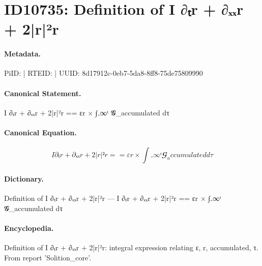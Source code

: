 \section*{ID10735: Definition of I ∂ₜr + ∂ₓₓr + 2|r|²r}
\paragraph{Metadata.}
PiID:  | RTEID:  | UUID: 8d17912c-0eb7-5da8-8ff8-75de75809990

\paragraph{Canonical Statement.}
I ∂ₜr + ∂ₓₓr + 2|r|²r == εr × ∫₋∞ᵗ 𝓖\_accumulated dτ

\paragraph{Canonical Equation.}
\[
I ∂ₜr + ∂ₓₓr + 2|r|²r == εr × ∫₋∞ᵗ 𝓖_accumulated dτ
\]

\paragraph{Dictionary.}
Definition of I ∂ₜr + ∂ₓₓr + 2|r|²r — I ∂ₜr + ∂ₓₓr + 2|r|²r == εr × ∫₋∞ᵗ 𝓖\_accumulated dτ

\paragraph{Encyclopedia.}
Definition of I ∂ₜr + ∂ₓₓr + 2|r|²r: integral expression relating ε, r, accumulated, τ. From report 'Solition\_core'.
